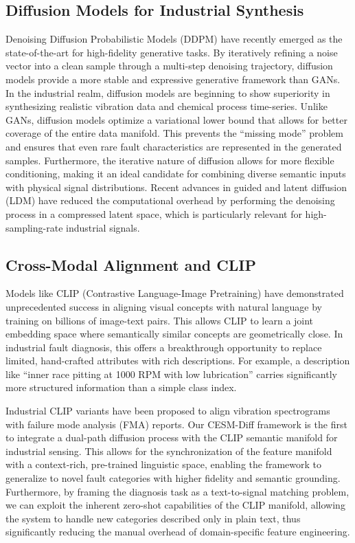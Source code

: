 \documentclass[journal]{IEEEtran}
\begin{document}
\subsection{Diffusion Models for Industrial Synthesis}
Denoising Diffusion Probabilistic Models (DDPM) have recently emerged as the state-of-the-art for high-fidelity generative tasks. By iteratively refining a noise vector into a clean sample through a multi-step denoising trajectory, diffusion models provide a more stable and expressive generative framework than GANs. In the industrial realm, diffusion models are beginning to show superiority in synthesizing realistic vibration data and chemical process time-series. Unlike GANs, diffusion models optimize a variational lower bound that allows for better coverage of the entire data manifold. This prevents the ``missing mode'' problem and ensures that even rare fault characteristics are represented in the generated samples. Furthermore, the iterative nature of diffusion allows for more flexible conditioning, making it an ideal candidate for combining diverse semantic inputs with physical signal distributions. Recent advances in guided and latent diffusion (LDM) have reduced the computational overhead by performing the denoising process in a compressed latent space, which is particularly relevant for high-sampling-rate industrial signals.

\subsection{Cross-Modal Alignment and CLIP}
Models like CLIP (Contrastive Language-Image Pretraining) have demonstrated unprecedented success in aligning visual concepts with natural language by training on billions of image-text pairs. This allows CLIP to learn a joint embedding space where semantically similar concepts are geometrically close. In industrial fault diagnosis, this offers a breakthrough opportunity to replace limited, hand-crafted attributes with rich descriptions. For example, a description like ``inner race pitting at 1000 RPM with low lubrication'' carries significantly more structured information than a simple class index.

Industrial CLIP variants have been proposed to align vibration spectrograms with failure mode analysis (FMA) reports. Our CESM-Diff framework is the first to integrate a dual-path diffusion process with the CLIP semantic manifold for industrial sensing. This allows for the synchronization of the feature manifold with a context-rich, pre-trained linguistic space, enabling the framework to generalize to novel fault categories with higher fidelity and semantic grounding. Furthermore, by framing the diagnosis task as a text-to-signal matching problem, we can exploit the inherent zero-shot capabilities of the CLIP manifold, allowing the system to handle new categories described only in plain text, thus significantly reducing the manual overhead of domain-specific feature engineering.
\end{document}
